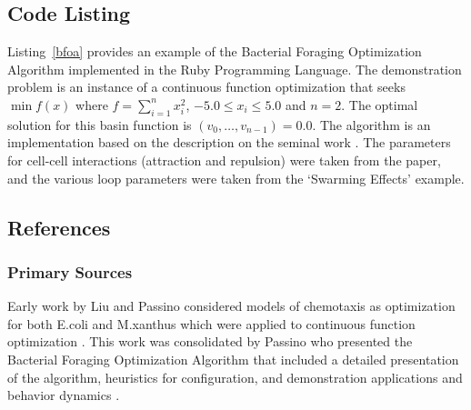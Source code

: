 \subsection{Code Listing}
Listing~\ref{bfoa} provides an example of the Bacterial Foraging Optimization Algorithm implemented in the Ruby Programming Language. 
The demonstration problem is an instance of a continuous function optimization that seeks $\min f(x)$ where $f=\sum_{i=1}^n x_{i}^2$, $-5.0\leq x_i \leq 5.0$ and $n=2$. The optimal solution for this basin function is $(v_0,\ldots,v_{n-1})=0.0$.
The algorithm is an implementation based on the description on the seminal work \cite{Passino2002}. The parameters for cell-cell interactions (attraction and repulsion) were taken from the paper, and the various loop parameters were taken from the `Swarming Effects' example.



\subsection{References}

% 
% 
\subsubsection{Primary Sources}
Early work by Liu and Passino considered models of chemotaxis as optimization for both E.coli and M.xanthus which were applied to continuous function optimization \cite{Liu2002}.
This work was consolidated by Passino who presented the Bacterial Foraging Optimization Algorithm that included a detailed presentation of the algorithm, heuristics for configuration, and demonstration applications and behavior dynamics \cite{Passino2002}.

